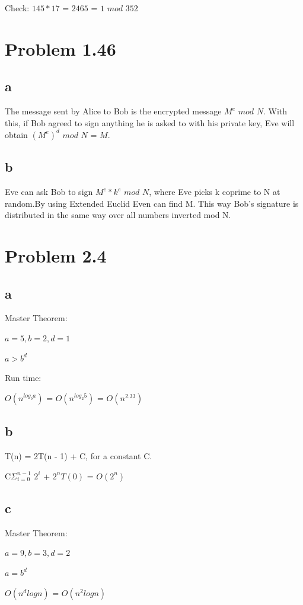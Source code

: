\documentclass{article}
\begin{document}
\vspace{2mm}

Check:
$145 * 17$ = $2465$ = $1$ $mod$ $352$

\section{Problem 1.46}
\subsection{a}
The message sent by Alice to Bob is the encrypted message $M^{e}$ $mod$ $N$. With this, if Bob agreed to sign anything he is asked to with his private key, Eve will obtain $(M^{e})^{d}$ $mod$ $N$ = $M$.
\subsection{b}
Eve can ask Bob to sign $M^{e} * k^{e}$ $mod$ $N$, where Eve picks k coprime to N at random.By using Extended Euclid Even can find M. This way Bob's signature is distributed in the same way over all numbers inverted mod N.

\section{Problem 2.4}
\subsection{a}
Master Theorem:

$a = 5, b = 2, d = 1$

$a > b^{d}$

Run time:

$O(n^{log_{b}a})$ =  $O(n^{log_{2}5})$ = $O(n^{2.33})$

\subsection{b}
T(n) = 2T(n - 1) + C, for a constant C.

C$\Sigma_{i=0}^{n-1}$ $2^{i}$ + $2^{n}T(0)$ = $O(2^{n})$

\subsection{c}
Master Theorem:

$a =9, b = 3, d = 2$

$a = b^{d}$

$O(n^{d}logn)$ = $O(n^{2}logn)$
\end{document}
